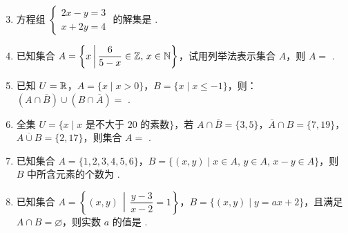\documentclass[a4paper,11pt]{article}
\begin{document}


\begin{enumerate}
\setcounter{enumi}{2}

\item 方程组 $\begin{cases}2x-y=3 \\ x+2y=4\end{cases}$ 的解集是 \blankline[2em].


\item 已知集合 $A=\left\{x\,\middle|\,\dfrac{6}{5-x}\in\mathbb{Z},\,x\in\mathbb{N}\right\}$，试用列举法表示集合 $A$，则 $A=$ \blankline[3em].


\item 已知 $U=\mathbb{R}$，$A=\{x\mid x>0\}$，$B=\{x\mid x\leqslant -1\}$，则：$\left(A\cap\overline{B}\right)\cup\left(B\cap\overline{A}\right)=$ \blankline[3em].


\item 全集 $U=\{x\mid x\text{ 是不大于 }20\text{ 的素数}\}$，若 $A\cap\overline{B}=\{3,5\}$，$\overline{A}\cap B=\{7,19\}$，$\overline{A\cup B}=\{2,17\}$，则集合 $A=$ \blankline[3em].


\ifanswer
\solbegin
{}
\solend

\fi
\item 已知集合 $A=\{1,2,3,4,5,6\}$，$B=\{(x,y)\mid x\in A,\,y\in A,\,x-y\in A\}$，则 $B$ 中所含元素的个数为 \blankline[2em].


\ifanswer
\solbegin
{}
\solend

\fi
\item 已知集合 $A=\left\{(x,y)\,\middle|\,\dfrac{y-3}{x-2}=1\right\}$，$B=\{(x,y)\mid y=ax+2\}$，且满足 $A\cap B=\varnothing$，则实数 $a$ 的值是 \blankline[2em].


\end{enumerate}
\end{document}
